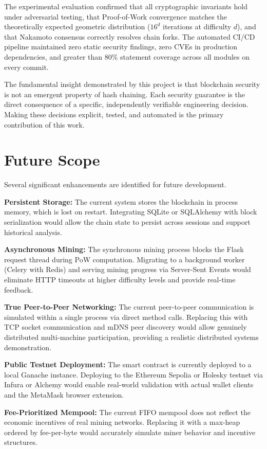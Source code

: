 \documentclass[12pt,a4paper]{report}
\begin{document}
The experimental evaluation confirmed that all cryptographic invariants hold under
adversarial testing, that Proof-of-Work convergence matches the theoretically expected
geometric distribution ($16^d$ iterations at difficulty $d$), and that Nakamoto consensus
correctly resolves chain forks. The automated CI/CD pipeline maintained zero static
security findings, zero CVEs in production dependencies, and greater than 80\% statement
coverage across all modules on every commit.

The fundamental insight demonstrated by this project is that blockchain security is not an
emergent property of hash chaining. Each security guarantee is the direct consequence of
a specific, independently verifiable engineering decision. Making these decisions explicit,
tested, and automated is the primary contribution of this work.

\section{Future Scope}

Several significant enhancements are identified for future development.

\textbf{Persistent Storage:} The current system stores the blockchain in process memory,
which is lost on restart. Integrating SQLite or SQLAlchemy with block serialization would
allow the chain state to persist across sessions and support historical analysis.

\textbf{Asynchronous Mining:} The synchronous mining process blocks the Flask request
thread during PoW computation. Migrating to a background worker (Celery with Redis) and
serving mining progress via Server-Sent Events would eliminate HTTP timeouts at higher
difficulty levels and provide real-time feedback.

\textbf{True Peer-to-Peer Networking:} The current peer-to-peer communication is simulated
within a single process via direct method calls. Replacing this with TCP socket communication
and mDNS peer discovery would allow genuinely distributed multi-machine participation,
providing a realistic distributed systems demonstration.

\textbf{Public Testnet Deployment:} The smart contract is currently deployed to a local
Ganache instance. Deploying to the Ethereum Sepolia or Holesky testnet via Infura or
Alchemy would enable real-world validation with actual wallet clients and the MetaMask
browser extension.

\textbf{Fee-Prioritized Mempool:} The current FIFO mempool does not reflect the economic
incentives of real mining networks. Replacing it with a max-heap ordered by fee-per-byte
would accurately simulate miner behavior and incentive structures.
\end{document}
